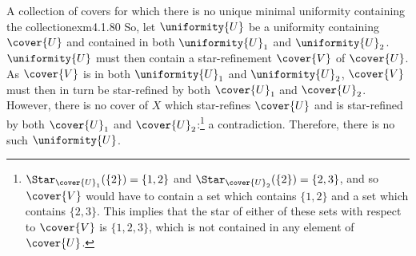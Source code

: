 \begin{exm}{A collection of covers for which there is no unique minimal uniformity containing the collection}{exm4.1.80}
So, let $\uniformity{U}$ be a uniformity containing $\cover{U}$ and contained in both $\uniformity{U}_1$ and $\uniformity{U}_2$.  $\uniformity{U}$ must then contain a star-refinement $\cover{V}$ of $\cover{U}$.  As $\cover{V}$ is in both $\uniformity{U}_1$ and $\uniformity{U}_2$, $\cover{V}$ must then in turn be star-refined by both $\cover{U}_1$ and $\cover{U}_2$.  However, there is no cover of $X$ which star-refines $\cover{U}$ and is star-refined by both $\cover{U}_1$ and $\cover{U}_2$:\footnote{$\Star _{\cover{U}_1}(\{ 2\} )=\{ 1,2\}$ and $\Star _{\cover{U}_2}(\{ 2\} )=\{ 2,3\}$, and so $\cover{V}$ would have to contain a set which contains $\{ 1,2\}$ and a set which contains $\{ 2,3\}$.  This implies that the star of either of these sets with respect to $\cover{V}$ is $\{ 1,2,3\}$, which is not contained in any element of $\cover{U}$.}  a contradiction.  Therefore, there is no such $\uniformity{U}$.
\end{exm}

